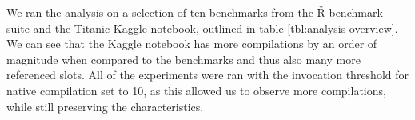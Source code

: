 \begin{table}[t]
	\caption{Overview of analyzed programs}\label{tbl:analysis-overview}
\end{table}

We ran the analysis on a selection of ten benchmarks from the Ř benchmark suite and the Titanic Kaggle notebook, outlined in table \ref{tbl:analysis-overview}. We can see that the Kaggle notebook has more compilations by an order of magnitude when compared to the benchmarks and thus also many more referenced slots. All of the experiments were ran with the invocation threshold for native compilation set to 10, as this allowed us to observe more compilations, while still preserving the characteristics.

